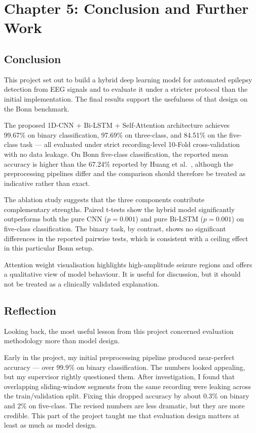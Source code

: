 \section*{Chapter 5: Conclusion and Further Work}
 \setcounter{section}{5} \setcounter{subsection}{0}

\subsection{Conclusion}

This project set out to build a hybrid deep learning model for automated epilepsy detection from EEG signals and to evaluate it under a stricter protocol than the initial implementation. The final results support the usefulness of that design on the Bonn benchmark.

The proposed 1D-CNN + Bi-LSTM + Self-Attention architecture achieves 99.67\% on binary classification, 97.69\% on three-class, and 84.51\% on the five-class task --- all evaluated under strict recording-level 10-Fold cross-validation with no data leakage. On Bonn five-class classification, the reported mean accuracy is higher than the 67.24\% reported by Huang et al.\ \cite{huang2025}, although the preprocessing pipelines differ and the comparison should therefore be treated as indicative rather than exact.

The ablation study suggests that the three components contribute complementary strengths. Paired t-tests show the hybrid model significantly outperforms both the pure CNN ($p = 0.001$) and pure Bi-LSTM ($p = 0.001$) on five-class classification. The binary task, by contrast, shows no significant differences in the reported pairwise tests, which is consistent with a ceiling effect in this particular Bonn setup.

Attention weight visualisation highlights high-amplitude seizure regions and offers a qualitative view of model behaviour. It is useful for discussion, but it should not be treated as a clinically validated explanation.

\subsection{Reflection}

Looking back, the most useful lesson from this project concerned evaluation methodology more than model design.

Early in the project, my initial preprocessing pipeline produced near-perfect accuracy --- over 99.9\% on binary classification. The numbers looked appealing, but my supervisor rightly questioned them. After investigation, I found that overlapping sliding-window segments from the same recording were leaking across the train/validation split. Fixing this dropped accuracy by about 0.3\% on binary and 2\% on five-class. The revised numbers are less dramatic, but they are more credible. This part of the project taught me that evaluation design matters at least as much as model design.

